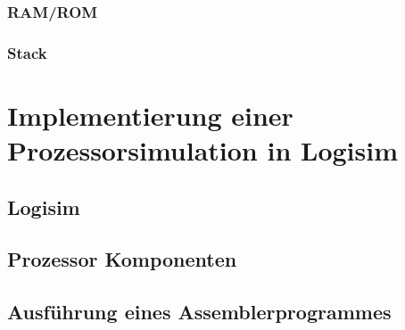 \documentclass[12pt]{article}
\begin{document}
\subsubsection{RAM/ROM}
\subsubsection{Stack}

\section{Implementierung einer Prozessorsimulation in Logisim}
\subsection{Logisim}
\subsection{Prozessor Komponenten}
\subsection{Ausführung eines Assemblerprogrammes}

\newpage

\end{document}
